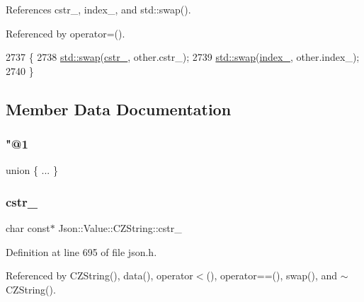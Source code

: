 References cstr\+\_\+, index\+\_\+, and std\+::swap().



Referenced by operator=().


\begin{DoxyCode}
2737                                         \{
2738   \hyperlink{namespacestd_a22cc6fcbbb1f2f705c7888b615e43582}{std::swap}(\hyperlink{class_json_1_1_value_1_1_c_z_string_a5b4d28349294034d7f779c3c95d0306c}{cstr\_}, other.cstr\_);
2739   \hyperlink{namespacestd_a22cc6fcbbb1f2f705c7888b615e43582}{std::swap}(\hyperlink{class_json_1_1_value_1_1_c_z_string_aecf29982235c9c165a0971023ebbb270}{index\_}, other.index\_);
2740 \}
\end{DoxyCode}


\subsection{Member Data Documentation}
\mbox{\label{class_json_1_1_value_1_1_c_z_string_a6f6b20ee7c8873fba58100f869ca2e5e}} 
\subsubsection{\texorpdfstring{"@1}{@1}}
{\footnotesize\ttfamily union \{ ... \} \hspace{0.3cm}{\ttfamily [private]}}

\mbox{\label{class_json_1_1_value_1_1_c_z_string_a5b4d28349294034d7f779c3c95d0306c}} 
\subsubsection{\texorpdfstring{cstr\+\_\+}{cstr\_}}
{\footnotesize\ttfamily char const$\ast$ Json\+::\+Value\+::\+C\+Z\+String\+::cstr\+\_\+\hspace{0.3cm}{\ttfamily [private]}}



Definition at line 695 of file json.\+h.



Referenced by C\+Z\+String(), data(), operator$<$(), operator==(), swap(), and $\sim$\+C\+Z\+String().

